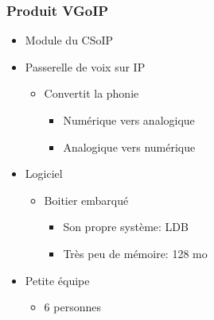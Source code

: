 \begin{frame}
    \frametitle{Produit VGoIP}
    \begin{itemize}
        \item Module du CSoIP
        \item Passerelle de voix sur IP
            \begin{itemize}
                \item Convertit la phonie
                    \begin{itemize}
                        \item Numérique vers analogique
                        \item Analogique vers numérique
                    \end{itemize}
            \end{itemize}
        \item Logiciel
        \begin{itemize}
            \item Boitier embarqué
                \begin{itemize}
                    \item Son propre système: LDB
                    \item Très peu de mémoire: 128 mo
                \end{itemize}
        \end{itemize}
        \item Petite équipe
            \begin{itemize}
                \item 6 personnes
            \end{itemize}
    \end{itemize}
\end{frame}
